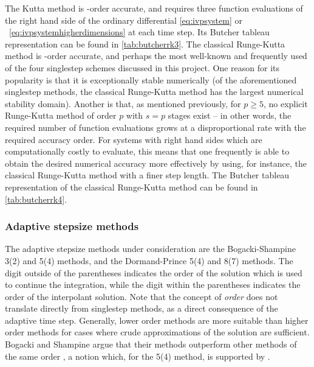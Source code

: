 The Kutta method is -order accurate, and requires three function
evaluations of the right hand side of the ordinary differential
\cref{eq:ivpsystem} or ~\eqref{eq:ivpsystemhigherdimensions} at each time
step. Its Butcher tableau representation can be found in \cref{tab:butcherrk3}.
The classical Runge-Kutta method is -order accurate, and perhaps the most
well-known and frequently used of the four singlestep schemes discussed in this
project. One reason for its popularity is that it is exceptionally stable
numerically (of the aforementioned singlestep methods, the classical
Runge-Kutta method has the largest numerical stability domain). Another is that,
as mentioned previously, for $p\geq5$, no explicit Runge-Kutta method of order
$p$ with $s=p$ stages exist
\parencite[p.173]{hairer1993solving} -- in other words,
the required number of function evaluations grows at a disproportional rate with
the required accuracy order. For systems with right hand sides which are
computationally costly to evaluate, this means that one frequently is able to
obtain the desired numerical accuracy more effectively by using, for instance,
the classical Runge-Kutta method with a finer step length. The Butcher tableau
representation of the classical Runge-Kutta method can be found in
\cref{tab:butcherrk4}.


\clearpage


\subsubsection{Adaptive stepsize methods}
\label{ssub:adaptive_stepsize_methods}

The adaptive stepsize methods under consideration are the Bogacki-Shampine
3(2) and 5(4) methods, and the Dormand-Prince 5(4) and 8(7) methods. The digit
outside of the parentheses indicates the order of the solution which is used
to continue the integration, while the digit within the parentheses indicates
the order of the interpolant solution. Note that the concept of \emph{order}
does not translate directly from singlestep methods, as a direct consequence
of the adaptive time step. Generally, lower order methods are more
suitable than higher order methods for cases where crude approximations of the
solution are sufficient. Bogacki and Shampine argue that their methods
outperform other methods of the same order
\parencite{bogacki1989pair,bogacki1996efficient}, a notion which, for the 5(4)
method, is supported by
\textcite[p.194]{hairer1993solving}.

